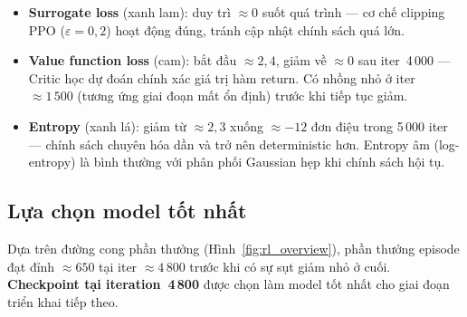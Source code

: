 \begin{itemize}
    \item \textbf{Surrogate loss} (xanh lam): duy trì $\approx 0$ suốt quá trình
    — cơ chế clipping PPO ($\varepsilon = 0{,}2$) hoạt động đúng, tránh cập nhật
    chính sách quá lớn.

    \item \textbf{Value function loss} (cam): bắt đầu $\approx 2{,}4$, giảm về
    $\approx 0$ sau iter~4\,000 — Critic học dự đoán chính xác giá trị hàm
    return. Có nhồng nhỏ ở iter $\approx 1\,500$ (tương ứng giai đoạn mất ổn định)
    trước khi tiếp tục giảm.

    \item \textbf{Entropy} (xanh lá): giảm từ $\approx 2{,}3$ xuống $\approx -12$
    đơn điệu trong 5\,000 iter — chính sách chuyên hóa dần và trở nên
    deterministic hơn. Entropy âm (log-entropy) là bình thường với phân phối
    Gaussian hẹp khi chính sách hội tụ.
\end{itemize}

\subsection{Lựa chọn model tốt nhất}
\label{subsec:rl_best_model}

Dựa trên đường cong phần thưởng (Hình~\ref{fig:rl_overview}), phần thưởng
episode đạt đỉnh $\approx 650$ tại iter $\approx 4\,800$ trước khi có sự sụt
giảm nhỏ ở cuối. \textbf{Checkpoint tại iteration~4\,800} được chọn làm model
tốt nhất cho giai đoạn triển khai tiếp theo.


